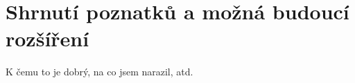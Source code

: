 \chapter{Shrnutí poznatků a možná budoucí rozšíření}

K čemu to je dobrý, na co jsem narazil, atd.


